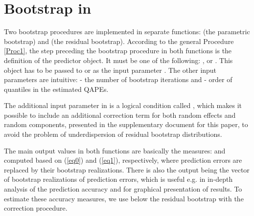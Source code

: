 \section{Bootstrap in }

Two bootstrap procedures are implemented in separate functions:  (the parametric bootstrap) and  (the residual bootstrap). According to the general Procedure \ref{Proc1}, the step preceding the bootstrap procedure in both functions is the definition of the predictor object. It must be one of the following: ,  or . This object has to be passed to  or  as the input parameter . The other input parameters are intuitive:  - the number of bootstrap iterations and  - order of quantiles in the estimated QAPEs.

The additional input parameter in  is a logical condition called , which makes it possible to include an additional correction term for both random effects and random components, presented in the supplementary document for this paper, to avoid the problem of underdispersion of residual bootstrap distributions.

The main output values in both functions are basically the measures:  and  computed based on (\ref{eq0}) and (\ref{eq1}), respectively, where prediction errors are replaced by their bootstrap realizations. There is also the output  being the vector of bootstrap realizations of prediction errors, which is useful e.g. in in-depth analysis of the prediction accuracy and for graphical presentation of results. To estimate these accuracy measures, we use below the residual bootstrap with the correction procedure.

